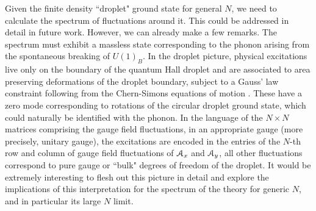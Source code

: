 Given the finite density ``droplet" ground state for general $N$, we need to calculate the spectrum of fluctuations around it. This could be addressed in detail in future work. However, we can already make a few remarks.  The spectrum must exhibit a massless state corresponding to the phonon arising from the spontaneous breaking of $U(1)_B$. In the droplet picture,  physical excitations live only on the boundary of the quantum Hall droplet and are associated to area preserving deformations of the droplet boundary, subject to a Gauss' law constraint following from the Chern-Simons equations of motion \cite{Polychronakos:2001mi}.  These have a zero mode corresponding to rotations of the circular droplet ground state, which could naturally be identified with the phonon.  In the language of the $N\times N$ matrices comprising the gauge field fluctuations, in an appropriate gauge (more precisely, unitary gauge), the excitations are encoded in the entries of the $N$-th row and column of gauge field fluctuations of ${\cal A}_x$ and ${\cal A}_y$, all other fluctuations correspond to pure gauge or ``bulk" degrees of freedom  of the droplet. 
It would be extremely interesting to flesh out this picture in detail and explore the implications of this interpretation for the spectrum of the theory for generic $N$, and in particular its large $N$ limit.
